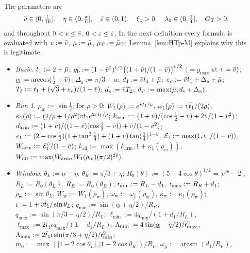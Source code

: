 The parameters are
\[
\bar v\in(0,\tfrac1{10}],\quad\eta\in(0,\tfrac\pi6],\quad\bar\varepsilon\in(0,1),\quad\xi_1>0,\quad\lambda_0\in(0,\tfrac14],\quad G_{\mathrm T}>0,
\]
and throughout $0<v\le\bar v$, $0<\varepsilon\le\bar\varepsilon$. In the next definition every formula is evaluated with $v:=\bar v$,
$\mu:=\bar\mu$, $\mu_{\mathrm T}:=\bar\mu_{\mathrm T}$; Lemma~\ref{lem:HTp-M} explains why this is legitimate.

\begin{TDdefinition}[Constants]\label{def:HTp-const}
{\small
\begin{itemize}\setlength\itemsep{2pt}
\item \emph{Basic.} $\bar t_1:=2+\bar\mu$; $g_{\mathrm b}:=(1-\bar v^2)^{1/2}\bigl((1+\bar v)/(1-\bar v)\bigr)^{\bar v/2}$ $(=g_{\max}$ at
$v=\bar v)$; $\underline\alpha:=\arccos(\frac12+\bar v)$; $\Delta_{\mathrm a}:=\pi/3-\underline\alpha$; $d_1:=\bar v\bar t_1+\bar\mu$;
$e_\rho:=\bar v\bar t_1+\Delta_{\mathrm a}+\bar\mu$; $T_2:=\bar t_1+(\sqrt3+e_\rho)/(1-\bar v)$; $d_{\mathrm s}:=\bar v T_2$;
$d_P:=\max(\bar\mu,d_{\mathrm s}+\Delta_{\mathrm a})$.
\item \emph{Run 1.} $\rho_{\mathrm m}:=\sin\frac12$; for $\rho>0$: $W_1(\rho):=e^{\bar v\bar t_1/\rho}$,
$\omega_1(\rho):=\bar v\bar t_1/(2\rho)$, $\kappa_1(\rho):=(2/\rho+1/\rho^2)\bar v\bar t_1e^{2\bar v\bar t_1/\rho}$;
$k_{\mathrm{arm}}:=(1+\bar v)/(\cos\frac12-\bar v)+2\bar v/(1-\bar v^2)$;
$d_{\mathrm{arm}}:=(1+\bar v)/((1-\bar v)(\cos\frac12-\bar v))+\bar v/(1-\bar v^2)$;
$e_1:=(2-\cos\frac12)(1+\tan^2\frac14)+(1+\bar v)\tan(\frac14)^{1-\bar v}$, $\mathcal E_1:=\max(1,e_1/(1-\bar v))$,
$W_{\mathrm{arm}}:=\mathcal E_1^{\bar v}/(1-\bar v)$; $k_{\mathrm{all}}:=\max(k_{\mathrm{arm}},1+\kappa_1(\rho_{\mathrm m}))$,
$W_{\mathrm{all}}:=\max(W_{\mathrm{arm}},W_1(\rho_{\mathrm m})(\pi/2)^{2\bar v})$.
\item \emph{Window.} $\theta_L:=\underline\alpha-\eta$, $\theta_R:=\pi/3+\eta$; $R_0(\theta):=(5-4\cos\theta)^{1/2}=|e^{i\theta}-2|$,
$R_L:=R_0(\theta_L)$, $R_R:=R_0(\theta_R)$; $\mathsf r_{\min}:=R_L-d_1$, $\mathsf r_{\max}:=R_R+d_1$; $\rho_{\mathrm w}:=\sin\theta_L$,
$W_{\mathrm w}:=W_1(\rho_{\mathrm w})$, $\omega_{\mathrm w}:=\omega_1(\rho_{\mathrm w})$, $\kappa_{\mathrm w}:=\kappa_1(\rho_{\mathrm w})$;
$\iota:=1+\bar v\bar t_1/\sin\theta_L$; $q_{\min}:=\sin(\underline\alpha+\eta/2)/R_R$, $q_{\max}:=\sin(\pi/3-\eta/2)/R_L$;
$\ell_{\min}:=4q_{\min}/(1+d_1/R_L)$, $\ell_{\max}:=2\bar t_1\iota q_{\max}/(1-d_1/R_L)$;
$\Lambda_{\min}:=4\sin(\underline\alpha-\eta/2)/\mathsf r_{\max}^2$, $\Lambda_{\max}:=2\bar t_1\iota\sin(\pi/3+\eta/2)/\mathsf r_{\min}^2$;
$m_0:=\max(|1-2\cos\theta_L|,|1-2\cos\theta_R|)/R_L$, $\omega_{\mathrm p}:=\arcsin(d_1/R_L)$,

\end{itemize}}
\end{TDdefinition}
